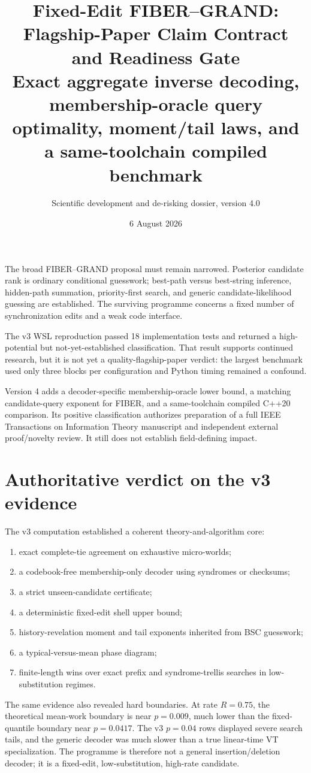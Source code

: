 \documentclass[11pt]{article}
\title{\textbf{Fixed-Edit FIBER--GRAND: Flagship-Paper Claim Contract and Readiness Gate}\\[1.5mm]
\large Exact aggregate inverse decoding, membership-oracle query optimality, moment/tail laws, and a same-toolchain compiled benchmark}
\author{Scientific development and de-risking dossier, version 4.0}
\date{6 August 2026}
\theoremstyle{definition}
\theoremstyle{remark}
\begin{document}
\maketitle

\begin{tcolorbox}[colback=blue!4,colframe=blue!55!black,title=Scientific status after gates v1--v3]
The broad FIBER--GRAND proposal must remain narrowed.  Posterior candidate rank is ordinary conditional guesswork; best-path versus best-string inference, hidden-path summation, priority-first search, and generic candidate-likelihood guessing are established.  The surviving programme concerns a fixed number of synchronization edits and a weak code interface.

The v3 WSL reproduction passed 18 implementation tests and returned a high-potential but not-yet-established classification.  That result supports continued research, but it is not yet a quality-flagship-paper verdict: the largest benchmark used only three blocks per configuration and Python timing remained a confound.

Version 4 adds a decoder-specific membership-oracle lower bound, a matching candidate-query exponent for FIBER, and a same-toolchain compiled C++20 comparison.  Its positive classification authorizes preparation of a full IEEE Transactions on Information Theory manuscript and independent external proof/novelty review.  It still does not establish field-defining impact.
\end{tcolorbox}

\tableofcontents
\newpage

\section{Authoritative verdict on the v3 evidence}
The v3 computation established a coherent theory-and-algorithm core:
\begin{enumerate}[label=(\roman*),leftmargin=2em]
\item exact complete-tie agreement on exhaustive micro-worlds;
\item a codebook-free membership-only decoder using syndromes or checksums;
\item a strict unseen-candidate certificate;
\item a deterministic fixed-edit shell upper bound;
\item history-revelation moment and tail exponents inherited from BSC guesswork;
\item a typical-versus-mean phase diagram;
\item finite-length wins over exact prefix and syndrome-trellis searches in low-substitution regimes.
\end{enumerate}
The same evidence also revealed hard boundaries.  At rate $R=0.75$, the theoretical mean-work boundary is near $p=0.009$, much lower than the fixed-quantile boundary near $p=0.0417$.  The v3 $p=0.04$ rows displayed severe search tails, and the generic decoder was much slower than a true linear-time VT specialization.  The programme is therefore not a general insertion/deletion decoder; it is a fixed-edit, low-substitution, high-rate candidate.
\end{document}
